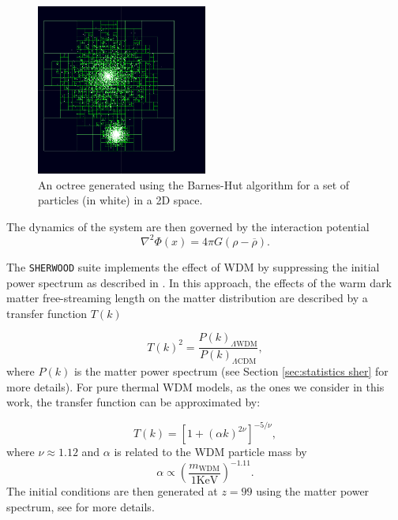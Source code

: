 \begin{figure}
        \centering
        \includegraphics[width=0.5\textwidth]{img/ML/Barnes_hut_tree.png}
        \caption{An octree generated using the Barnes-Hut algorithm for a set of particles (in white) in a 2D space.}
        \label{fig: 2D Barnes Hut}     
\end{figure}

The  dynamics of the system are then governed by the interaction potential
\begin{equation}
        \nabla^2\varPhi(x)=4\pi G(\rho-\overline{\rho}).
\end{equation}

The \texttt{SHERWOOD} suite implements the effect of WDM by suppressing the initial power spectrum as described in \cite{Viel_2005}. In this approach, the effects of the warm dark matter free-streaming length on the matter distribution are described by a transfer function $T(k)$

\begin{equation}
        T(k)^2=\frac{P(k)_{\Lambda\mathrm{WDM}}}{P(k)_{\Lambda\mathrm{CDM}}},
\end{equation}
where $P(k)$ is the matter power spectrum (see Section \ref{sec:statistics sher} for more details). For pure thermal WDM models, as the ones we consider in this work, the transfer function can be approximated by:

\begin{equation}
        T(k)=[1+(\alpha k)^{2\nu}]^{-5/\nu},
\end{equation}
where $\nu\approx 1.12$ and $\alpha$ is related to the WDM particle mass by
\begin{equation}
        \alpha \propto \left( \frac{m_\mathrm{WDM}}{1 \mathrm{KeV}} \right)^{-1.11}.
\end{equation}
The initial conditions are then generated at $z=99$ using the matter power spectrum, see \cite{Bolton_2016} for more details.

